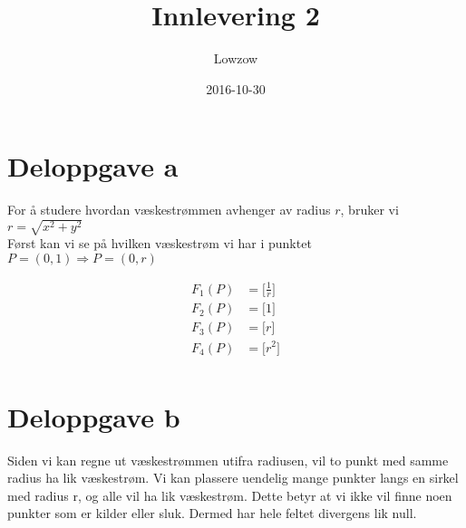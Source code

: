 \documentclass{article}
\title{Innlevering 2}
\date{2016-10-30}
\author{Lowzow}
\begin{document}
	\maketitle
	\newpage

	\section{Deloppgave a}
	For å studere hvordan væskestrømmen avhenger av radius $r$, bruker vi 
	\\ $r = \sqrt{x^2 + y^2}$ \\ Først kan vi se på hvilken væskestrøm vi har i punktet
	\\ $P = (0,1) \Rightarrow P = (0,r)$

	\begin{align*}
		F_1(P) &= \Big[\frac{1}{r} \Big] \\
		F_2(P) &= \Big[1 \Big] \\
		F_3(P) &= \Big[{r} \Big] \\
		F_4(P) &= \Big[r^2 \Big] \\
	\end{align*}

	\section{Deloppgave b}
	Siden vi kan regne ut væskestrømmen utifra radiusen, vil to punkt med samme radius ha lik væskestrøm. Vi kan plassere uendelig mange punkter langs en sirkel med radius r, og alle vil ha lik væskestrøm. Dette betyr at vi ikke vil finne noen punkter som er kilder eller sluk. Dermed har hele feltet divergens lik null.
\end{document}
